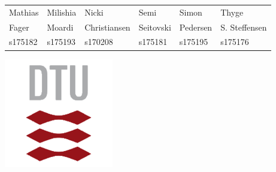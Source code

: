 \begin{titlingpage}
\begin{adjustbox}{center}
\begin{tabular}{llllll}
                \\ %
                     Mathias & Milishia & Nicki & Semi & Simon & Thyge
                \\
                Fager & Moardi & Christiansen & Seitovski & Pedersen & S. Steffensen
                \\
                s175182 & s175193 & s170208 & s175181 & s175195 &s175176
                \end{tabular}
                
                \label{tab:my_label}
        \end{adjustbox}
        \vspace{.5cm}
        \begin{center}
            \includegraphics{fig/dtu/DTU_small.png}
        \end{center}
    \end{titlingpage}